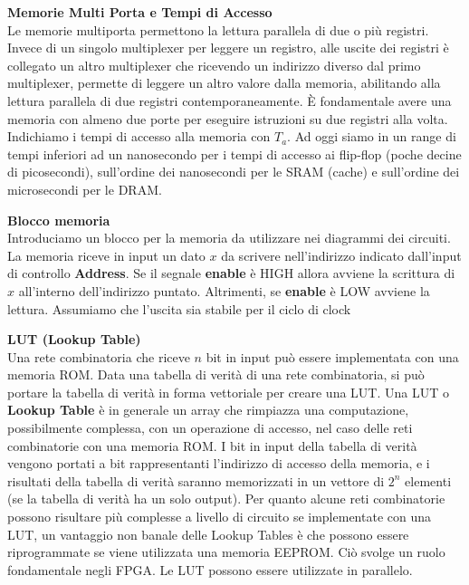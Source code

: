 \begin{defn}
	\textbf{Memorie Multi Porta e Tempi di Accesso} \\
	Le memorie multiporta permettono la lettura parallela di due o più registri.
	Invece di un singolo multiplexer per leggere un registro, alle uscite dei
	registri è collegato un altro multiplexer che ricevendo un indirizzo diverso dal
	primo multiplexer, permette di leggere un altro valore dalla memoria, abilitando
	alla lettura parallela di due registri contemporaneamente. È fondamentale avere
	una memoria con almeno due porte per eseguire istruzioni su due registri alla
	volta. Indichiamo i tempi di accesso alla memoria con $ T_a $. Ad oggi siamo in
	un range di tempi inferiori ad un nanosecondo per i tempi di accesso ai
	flip-flop (poche decine di picosecondi), sull'ordine dei nanosecondi per le SRAM
	(cache) e sull'ordine dei microsecondi per le DRAM.
\end{defn}



\begin{defn}
	\textbf{Blocco memoria}\\
	Introduciamo un blocco per la memoria da utilizzare nei diagrammi dei circuiti.
	La memoria riceve in input un dato $ x $ da scrivere nell'indirizzo indicato
	dall'input di controllo \textbf{Address}. Se il segnale \textbf{enable} è HIGH
	allora avviene la scrittura di $ x $ all'interno dell'indirizzo puntato.
	Altrimenti, se \textbf{enable} è LOW avviene la lettura. Assumiamo che l'uscita
	sia stabile per il ciclo di clock
\end{defn}


\begin{defn}
	\textbf{LUT (Lookup Table)} \\
	Una rete combinatoria che riceve $ n $ bit in input può essere implementata con
	una memoria ROM. Data una tabella di verità di una rete combinatoria, si può
	portare la tabella di verità in forma vettoriale per creare una LUT. Una LUT o
	\textbf{Lookup Table} è in generale un array che rimpiazza una computazione,
	possibilmente complessa, con un operazione di accesso, nel caso delle reti
	combinatorie con una memoria ROM. I bit in input della tabella di verità vengono
	portati a bit rappresentanti l'indirizzo di accesso della memoria, e i risultati
	della tabella di verità saranno memorizzati in un vettore di $ 2^n $ elementi
	(se la tabella di verità ha un solo output). Per quanto alcune reti combinatorie
	possono risultare più complesse a livello di circuito se implementate con una
	LUT, un vantaggio non banale delle Lookup Tables è che possono essere
	riprogrammate se viene utilizzata una memoria EEPROM. Ciò svolge un ruolo
	fondamentale negli FPGA. Le LUT possono essere utilizzate in parallelo.
\end{defn}

